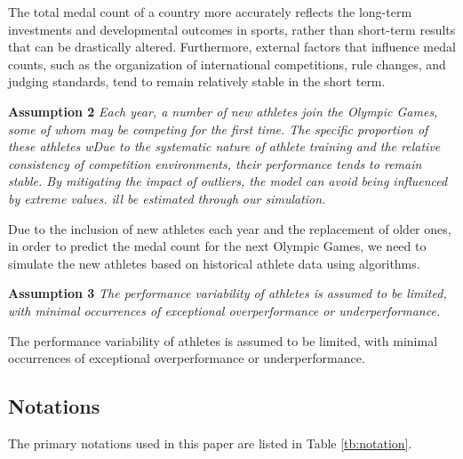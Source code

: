 \documentclass[12pt]{article}  %
\begin{document}
The total medal count of a country more accurately reflects the long-term investments and developmental outcomes in sports, rather than short-term results that can be drastically altered. Furthermore, external factors that influence medal counts, such as the organization of international competitions, rule changes, and judging standards, tend to remain relatively stable in the short term.


\textbf{Assumption 2 } \textit{Each year, a number of new athletes join the Olympic Games, some of whom may be competing for the first time. The specific proportion of these athletes wDue to the systematic nature of athlete training and the relative consistency of competition environments, their performance tends to remain stable. By mitigating the impact of outliers, the model can avoid being influenced by extreme values.  ill be estimated through our simulation. }

Due to the inclusion of new athletes each year and the replacement of older ones, in order to predict the medal count for the next Olympic Games, we need to simulate the new athletes based on historical athlete data using algorithms.


\textbf{Assumption 3} \textit{ The performance variability of athletes is assumed to be limited, with minimal occurrences of exceptional overperformance or underperformance.  }

The performance variability of athletes is assumed to be limited, with minimal occurrences of exceptional overperformance or underperformance.  


\subsection{Notations}

The primary notations used in this paper are listed in Table \ref{tb:notation}.

\end{document}
